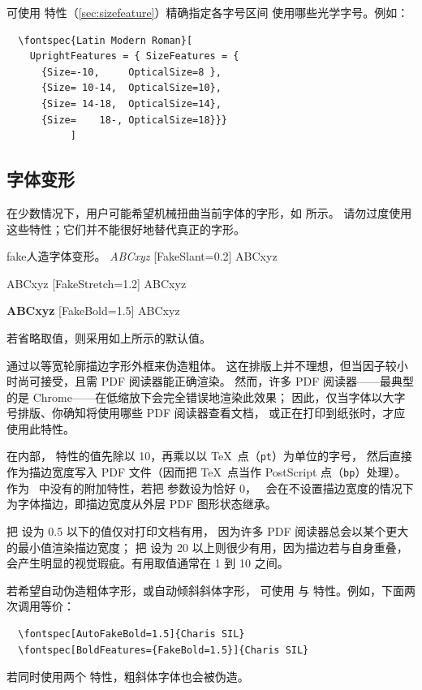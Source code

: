 \documentclass[a4paper]{l3doc}
\begin{document}
可使用  特性（\vref{sec:sizefeature}）精确指定各字号区间
使用哪些光学字号。例如：
\begin{Verbatim}
  \fontspec{Latin Modern Roman}[
    UprightFeatures = { SizeFeatures = {
      {Size=-10,     OpticalSize=8 },
      {Size= 10-14,  OpticalSize=10},
      {Size= 14-18,  OpticalSize=14},
      {Size=    18-, OpticalSize=18}}}
           ]
\end{Verbatim}

\subsection{字体变形}

在少数情况下，用户可能希望机械扭曲当前字体的字形，如  所示。
请勿过度使用这些特性；它们并不能很好地替代真正的字形。

\begin{Xexample}{fake}{人造字体变形。}
   \emph{ABCxyz} \quad
  [FakeSlant=0.2] ABCxyz

    ABCxyz \quad
  [FakeStretch=1.2] ABCxyz

   \textbf{ABCxyz} \quad
  [FakeBold=1.5] ABCxyz
\end{Xexample}

若省略取值，则采用如上所示的默认值。

 通过以等宽轮廓描边字形外框来伪造粗体。
这在排版上并不理想，但当因子较小时尚可接受，且需 PDF 阅读器能正确渲染。
然而，许多 PDF 阅读器——最典型的是 Chrome——在低缩放下会完全错误地渲染此效果；
因此，仅当字体以大字号排版、你确知将使用哪些 PDF 阅读器查看文档，
或正在打印到纸张时，才应使用此特性。

在内部， 特性的值先除以 10，再乘以以 \TeX\ 点（\verb|pt|）为单位的字号，
然后直接作为描边宽度写入 PDF 文件（因而把 \TeX\ 点当作 PostScript 点（\verb|bp|）处理）。
作为 \XeTeX\ 中没有的附加特性，若把  参数设为恰好 0，
\LuaTeX\ 会在不设置描边宽度的情况下为字体描边，即描边宽度从外层 PDF 图形状态继承。

把  设为 0.5 以下的值仅对打印文档有用，
因为许多 PDF 阅读器总会以某个更大的最小值渲染描边宽度；
把  设为 20 以上则很少有用，因为描边若与自身重叠，
会产生明显的视觉瑕疵。有用取值通常在 1 到 10 之间。

若希望自动伪造粗体字形，或自动倾斜斜体字形，
可使用  与  特性。例如，下面两次调用等价：
\begin{Verbatim}
  \fontspec[AutoFakeBold=1.5]{Charis SIL}
  \fontspec[BoldFeatures={FakeBold=1.5}]{Charis SIL}
\end{Verbatim}
若同时使用两个  特性，粗斜体字体也会被伪造。
\end{document}
